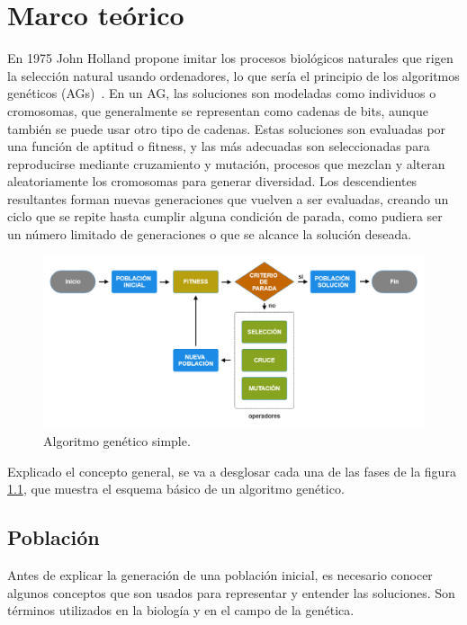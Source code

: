 \chapter{Marco teórico}
\label{ch:marco-teorico}

En 1975 John Holland propone imitar los procesos biológicos naturales que rigen la selección natural usando ordenadores, lo que sería el principio de los algoritmos genéticos (AGs)~\cite{holland1975}. En un AG, las soluciones son modeladas como individuos o cromosomas, que generalmente se representan como cadenas de bits, aunque también se puede usar otro tipo de cadenas. Estas soluciones son evaluadas por una función de aptitud o fitness, y las más adecuadas son seleccionadas para reproducirse mediante cruzamiento y mutación, procesos que mezclan y alteran aleatoriamente los cromosomas para generar diversidad. Los descendientes resultantes forman nuevas generaciones que vuelven a ser evaluadas, creando un ciclo que se repite hasta cumplir alguna condición de parada, como pudiera ser un número limitado de generaciones o que se alcance la solución deseada.

\begin{figure}[H]
    \centering
    \includegraphics[width=1\textwidth]{figures/algoritmo-genetico.png}
    \caption{Algoritmo genético simple.}
    \label{fig:algoritmo-genetico}
  \end{figure}

Explicado el concepto general, se va a desglosar cada una de las fases de la figura \ref{fig:algoritmo-genetico}, que muestra el esquema básico de un algoritmo genético.

\section{Población}

Antes de explicar la generación de una población inicial, es necesario conocer algunos conceptos que son usados para representar y entender las soluciones. Son términos utilizados en la biología y en el campo de la genética. 

